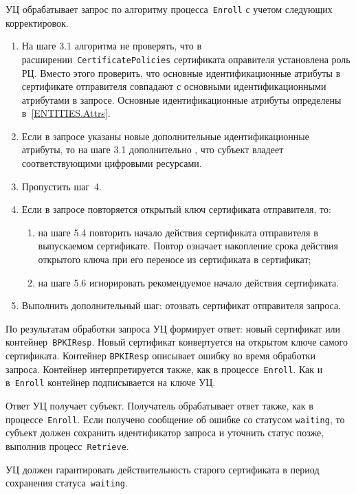 УЦ обрабатывает запрос по алгоритму процесса~\texttt{Enroll}
с учетом следующих корректировок.
\begin{enumerate}
\item
На шаге 3.1 алгоритма не проверять, что в
расширении~\texttt{CertificatePolicies} сертификата оправителя установлена
роль РЦ. Вместо этого проверить, что основные идентификационные атрибуты
в сертификате отправителя совпадают с основными идентификационными
атрибутами в запросе. Основные идентификационные атрибуты определены
в~\ref{ENTITIES.Attrs}.

\item
Если в запросе указаны новые дополнительные идентификационные атрибуты,
то на шаге 3.1 дополнительно , что субъект владеет 
соответствующими цифровыми ресурсами. 

\item
Пропустить шаг~4.

\item
Если в запросе повторяется открытый ключ сертификата отправителя, то:
\begin{enumerate}
\item
на шаге 5.4 повторить начало действия сертификата отправителя в выпускаемом 
сертификате. Повтор означает накопление срока действия открытого ключа 
при его переносе из сертификата в сертификат; 

%

\item
на шаге 5.6 игнорировать рекомендуемое начало действия сертификата.
\end{enumerate}

\item
Выполнить дополнительный шаг: отозвать сертификат отправителя запроса.
\end{enumerate}

По результатам обработки запроса УЦ формирует ответ: новый сертификат или 
контейнер~\texttt{BPKIResp}. Новый сертификат конвертуется на открытом 
ключе самого сертификата. Контейнер \texttt{BPKIResp} описывает ошибку во 
время обработки запроса. Контейнер интерпретируется также, как в 
процессе~\texttt{Enroll}. Как и в~\texttt{Enroll} контейнер подписывается 
на ключе УЦ.

Ответ УЦ получает субъект. Получатель обрабатывает ответ также, 
как в процессе~\texttt{Enroll}. 
%
Если получено сообщение об ошибке со статусом
\texttt{waiting}, то субъект должен сохранить идентификатор запроса
и уточнить статус позже, выполнив процесс~\texttt{Retrieve}.

УЦ должен гарантировать действительность старого сертификата
в период сохранения статуса~\texttt{waiting}.

